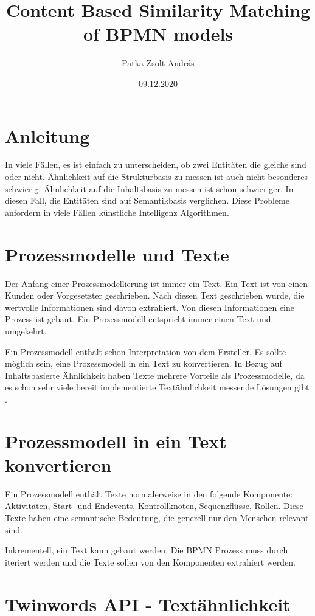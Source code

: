 \documentclass[12pt]{article}
\title{\vspace{-2cm}Content Based Similarity Matching of BPMN models}
\date{\vspace{-1.5cm}09.12.2020}
\author{\vspace{-2cm}Patka Zsolt-András}
\begin{document}
\maketitle

\section{Anleitung}

In viele Fällen, es ist einfach zu unterscheiden, ob zwei Entitäten die gleiche sind oder nicht. Ähnlichkeit auf die Strukturbasis zu messen ist auch nicht besonderes schwierig. Ähnlichkeit auf die Inhaltsbasis zu messen ist schon schwieriger. In diesen Fall, die Entitäten sind auf Semantikbasis verglichen. Diese Probleme anfordern in viele Fällen künstliche Intelligenz Algorithmen.

\section{Prozessmodelle und Texte}

Der Anfang einer Prozessmodellierung ist immer ein Text. Ein Text ist von einen Kunden oder Vorgesetzter geschrieben. Nach diesen Text geschrieben wurde, die wertvolle Informationen sind davon extrahiert. Von diesen Informationen eine Prozess ist gebaut. Ein Prozessmodell entspricht immer einen Text und umgekehrt. 

Ein Prozessmodell enthält schon Interpretation von dem Ersteller. Es sollte möglich sein, eine Prozessmodell in ein Text zu konvertieren. In Bezug auf Inhaltsbasierte Ähnlichkeit haben Texte mehrere Vorteile als Prozessmodelle, da es schon sehr viele bereit implementierte Textähnlichkeit messende Lösungen gibt \cite{gomaa2013survey}.

\section{Prozessmodell in ein Text konvertieren}

Ein Prozessmodell enthält Texte normalerweise in den folgende Komponente: Aktivitäten, Start- und Endevents, Kontrollknoten, Sequenzflüsse, Rollen. Diese Texte haben eine semantische Bedeutung, die generell nur den Menschen relevant sind. 

Inkrementell, ein Text kann gebaut werden. Die BPMN Prozess muss durch iteriert werden und die Texte sollen von den Komponenten extrahiert werden. 

\section{Twinwords API - Textähnlichkeit}
\end{document}
